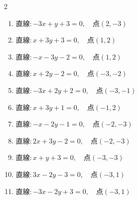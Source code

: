 \begin{multicols}{2}
\begin{enumerate}
\columnbreak %

  \item $直線:-3x+y+3=0,\quad 点 ( 2, -3 )$


  \item $直線:x+3y+3=0,\quad 点 ( 1, 2 )$


  \item $直線:-x-3y-2=0,\quad 点 ( 1, 2 )$


  \item $直線:x+2y-2=0,\quad 点 ( -3, -2 )$


  \item $直線:-3x+2y+2=0,\quad 点 ( -3, -1 )$


  \item $直線:x+3y+1=0,\quad 点 ( -1, 2 )$


  \item $直線:-x-2y-1=0,\quad 点 ( -2, -3 )$


  \item $直線:2x+3y-2=0,\quad 点 ( -2, -3 )$


  \item $直線:x+y+3=0,\quad 点 ( -3, -3 )$


  \item $直線:3x-2y-3=0,\quad 点 ( -3, 1 )$


\columnbreak %

\resetques

  \item $直線:-3x-2y+3=0,\quad 点 ( -3, 1 )$



\end{enumerate}
\end{multicols}
